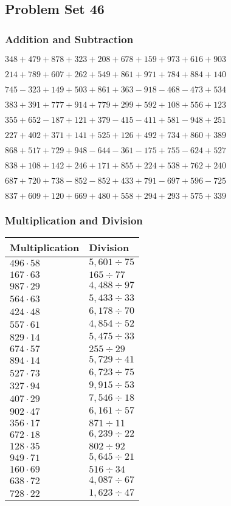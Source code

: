 \hypertarget{problem-set-46-1}{%
\subsection{Problem Set 46}\label{problem-set-46-1}}

\hypertarget{addition-and-subtraction-146}{%
\subsubsection{Addition and
Subtraction}\label{addition-and-subtraction-146}}

\(348 + 479 + 878 + 323 + 208 + 678 + 159 + 973 + 616 + 903\)

\(214 + 789 + 607 + 262 + 549 + 861 + 971 + 784 + 884 + 140\)

\(745 - 323 + 149 + 503 + 861 + 363 - 918 - 468 - 473 + 534\)

\(383 + 391 + 777 + 914 + 779 + 299 + 592 + 108 + 556 + 123\)

\(355 + 652 - 187 + 121 + 379 - 415 - 411 + 581 - 948 + 251\)

\(227 + 402 + 371 + 141 + 525 + 126 + 492 + 734 + 860 + 389\)

\(868 + 517 + 729 + 948 - 644 - 361 - 175 + 755 - 624 + 527\)

\(838 + 108 + 142 + 246 + 171 + 855 + 224 + 538 + 762 + 240\)

\(687 + 720 + 738 - 852 - 852 + 433 + 791 - 697 + 596 - 725\)

\(837 + 609 + 120 + 669 + 480 + 558 + 294 + 293 + 575 + 339\)

\hypertarget{multiplication-and-division-146}{%
\subsubsection{Multiplication and
Division}\label{multiplication-and-division-146}}

\begin{longtable}[]{@{}ll@{}}
\toprule
Multiplication & Division\tabularnewline
\midrule
\endhead
\(496 \cdot 58\) & \(5,601÷75\)\tabularnewline
\(167 \cdot 63\) & \(165÷77\)\tabularnewline
\(987 \cdot 29\) & \(4,488÷97\)\tabularnewline
\(564 \cdot 63\) & \(5,433÷33\)\tabularnewline
\(424 \cdot 48\) & \(6,178÷70\)\tabularnewline
\(557 \cdot 61\) & \(4,854÷52\)\tabularnewline
\(829 \cdot 14\) & \(5,475÷33\)\tabularnewline
\(674 \cdot 57\) & \(255÷29\)\tabularnewline
\(894 \cdot 14\) & \(5,729÷41\)\tabularnewline
\(527 \cdot 73\) & \(6,723÷75\)\tabularnewline
\(327 \cdot 94\) & \(9,915÷53\)\tabularnewline
\(407 \cdot 29\) & \(7,546÷18\)\tabularnewline
\(902 \cdot 47\) & \(6,161÷57\)\tabularnewline
\(356 \cdot 17\) & \(871÷11\)\tabularnewline
\(672 \cdot 18\) & \(6,239÷22\)\tabularnewline
\(128 \cdot 35\) & \(802÷92\)\tabularnewline
\(949 \cdot 71\) & \(5,645÷21\)\tabularnewline
\(160 \cdot 69\) & \(516÷34\)\tabularnewline
\(638 \cdot 72\) & \(4,087÷67\)\tabularnewline
\(728 \cdot 22\) & \(1,623÷47\)\tabularnewline
\bottomrule
\end{longtable}

